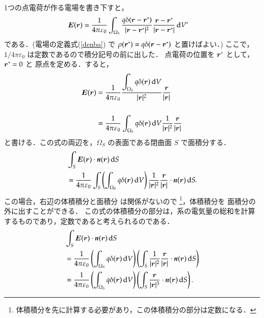             1つの点電荷が作る電場を書き下すと，
                \begin{align}
                    \boldsymbol{E}(\boldsymbol{r})
                    &=\frac{1}{4\pi\varepsilon_{0}}\int_{\Omega_{S}}
                    \frac{q\delta(\boldsymbol{r}-\boldsymbol{r}^{*})}
                         {|\boldsymbol{r}-\boldsymbol{r}^{*}|^{2}}
                    \frac{\boldsymbol{r}-\boldsymbol{r}^{*}}
                         {|\boldsymbol{r}-\boldsymbol{r}^{*}|}\,\mathrm{d} V^{*}
                \end{align}
            である．(電場の定義式(\ref{denba})
            で $\rho(\boldsymbol{r}^{*})
            =q\delta(\boldsymbol{r}-\boldsymbol{r}^{*})$ と置けばよい．)
            ここで， $1/4\pi\varepsilon_{0}$ は定数であるので積分記号の前に出した．
            点電荷の位置を $\boldsymbol{r}^{*}$ として，$\boldsymbol{r}^{*}=0$ と
            原点を定める．すると，
                \begin{align*}
                    \boldsymbol{E}(\boldsymbol{r})
                    &=\frac{1}{4\pi\varepsilon_{0}}
                    \frac{\displaystyle\int_{\Omega_{S}}
                    q\delta(\boldsymbol{r})\,\mathrm{d} V}{|\boldsymbol{r}|^{2}}
                    \frac{\boldsymbol{r}}
                         {|\boldsymbol{r}|}  \\  \\
                    &=\frac{1}{4\pi\varepsilon_{0}} \int_{\Omega_{S}}
                    q\delta(\boldsymbol{r})\,\mathrm{d} V
                    \frac{1}{|\boldsymbol{r}|^{2}}
                    \frac{\boldsymbol{r}}
                         {|\boldsymbol{r}|}
                \end{align*}
            と書ける．この式の両辺を，$\Omega_{S}$ の表面である閉曲面 $S$ で面積分する．
                \begin{align*}
                    &\int_{S}\boldsymbol{E}(\boldsymbol{r})\cdot\textit{\textbf{n}}(\boldsymbol{r})\,\mathrm{d} S \\
                    &=\frac{1}{4\pi\varepsilon_{0}}
                    \int_{S}\left( \int_{\Omega_{S}} q\delta(\boldsymbol{r})\,\mathrm{d} V \right)
                    \frac{1}{|\boldsymbol{r}|^{2}}
                    \frac{\boldsymbol{r}}
                         {|\boldsymbol{r}|}\cdot\textit{\textbf{n}}(\boldsymbol{r})\,\mathrm{d} S.
                \end{align*}
            この場合，右辺の体積積分と面積分 は関係がないので
                \footnote{
                        体積積分を先に計算する必要があり，この体積積分の部分は定数になる．
                }，体積積分を
            面積分の外に出すことができる．
            この式の体積積分の部分は，系の電気量の総和を計算するものであり，定数であると考えられるのである．
                \begin{align*}
                    &\int_{S}\boldsymbol{E}(\boldsymbol{r})\cdot\textit{\textbf{n}}(\boldsymbol{r})\,\mathrm{d} S \\
                    &=
                    \frac{1}{4\pi\varepsilon_{0}}
                    \left(\int_{\Omega _{S}}q\delta(\boldsymbol{r})\,\mathrm{d} V \right)
                    \left(\int_{S} \frac{1}{|\boldsymbol{r}|^{2}}
                    \frac{\boldsymbol{r}}{|\boldsymbol{r}|} \cdot \textit{\textbf{n}}(\boldsymbol{r})\,\mathrm{d} S \right) \\
                    &=
                    \frac{1}{4\pi\varepsilon_{0}}
                    \left(\int_{\Omega _{S}}q\delta(\boldsymbol{r})\,\mathrm{d} V \right)
                    \left(\int_{S} \frac{\boldsymbol{r}}{|\boldsymbol{r}|^{3}}
                    \cdot \textit{\textbf{n}}(\boldsymbol{r})\,\mathrm{d} S \right).
                \end{align*}
